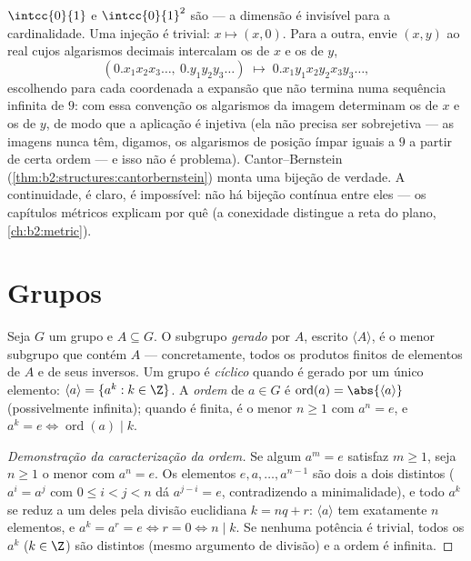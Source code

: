 \begin{example}\label{ex:b2:structures:squareseg}
$\intcc{0}{1}$ e $\intcc{0}{1}^2$ são  --- a dimensão
é invisível para a cardinalidade. Uma injeção é trivial: $x
\mapsto (x, 0)$. Para a outra, envie $(x, y)$ ao real cujos
algarismos decimais intercalam os de $x$ e os de $y$,
\[
(0.x_1x_2x_3\dots,\ 0.y_1y_2y_3\dots)
\;\longmapsto\; 0.x_1y_1x_2y_2x_3y_3\dots,
\]
escolhendo para cada coordenada a expansão que não termina numa
sequência infinita de $9$: com essa convenção os algarismos da imagem
determinam os de $x$ e os de $y$, de modo que a aplicação é injetiva (ela não
precisa ser sobrejetiva --- as imagens nunca têm, digamos, os
algarismos de posição ímpar iguais a $9$ a partir de certa ordem --- e isso não é problema).
Cantor--Bernstein (\cref{thm:b2:structures:cantorbernstein})
monta uma bijeção de verdade. A continuidade, é claro, é
impossível: não há bijeção contínua entre eles ---
os capítulos métricos explicam por quê (a conexidade distingue
a reta do plano, \cref{ch:b2:metric}).
\end{example}

\section{Grupos}

\begin{definition}\label{def:b2:structures:generated}
Seja $G$ um grupo e $A \subseteq G$. O subgrupo \emph{gerado}
por $A$, escrito $\langle A \rangle$, é o menor subgrupo
que contém $A$ --- concretamente, todos os produtos finitos de elementos de $A$
e de seus inversos. Um grupo é \emph{cíclico} quando
é gerado por um único elemento: $\langle a\rangle = \{a^k : k \in \Z\}$.
A \emph{ordem} de $a \in G$ é
$\operatorname{ord}(a) = \abs{\langle a \rangle}$ (possivelmente
infinita); quando é finita, é o menor $n \geq 1$ com $a^n = e$,
e $a^k = e \iff \operatorname{ord}(a) \mid k$.
\end{definition}

\begin{proof}[Demonstração da caracterização da ordem]
Se algum $a^m = e$ satisfaz $m \geq 1$, seja $n \geq 1$ o menor com $a^n
= e$. Os elementos $e, a, \dots, a^{n-1}$ são dois a dois distintos
($a^{i} = a^{j}$ com $0 \leq i < j < n$ dá $a^{j-i} = e$,
contradizendo a minimalidade), e todo $a^k$ se reduz a um deles pela
divisão euclidiana $k = nq + r$: $\langle a\rangle$ tem exatamente $n$
elementos, e $a^k = a^r = e \iff r = 0 \iff n \mid k$. Se nenhuma potência
é trivial, todos os $a^k$ ($k \in \Z$) são distintos (mesmo argumento de
divisão) e a ordem é infinita.
\end{proof}

